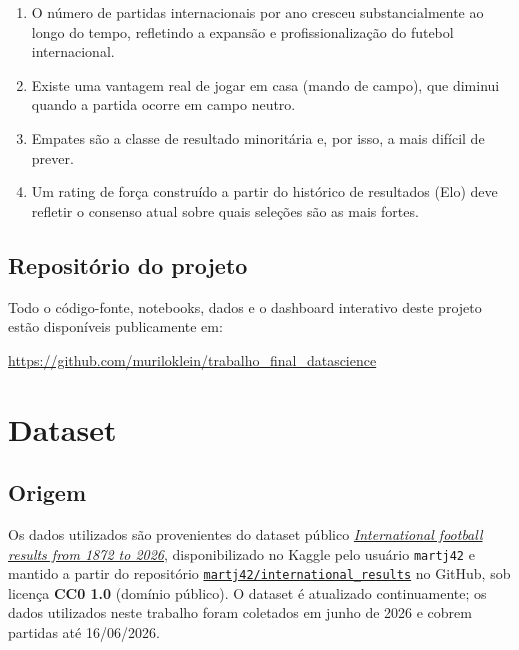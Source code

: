 \documentclass[12pt,a4paper]{article}
\begin{document}
\begin{enumerate}[label=\textbf{H\arabic*.}]
    \item O número de partidas internacionais por ano cresceu substancialmente
    ao longo do tempo, refletindo a expansão e profissionalização do futebol
    internacional.
    \item Existe uma vantagem real de jogar em casa (mando de campo), que
    diminui quando a partida ocorre em campo neutro.
    \item Empates são a classe de resultado minoritária e, por isso, a mais
    difícil de prever.
    \item Um rating de força construído a partir do histórico de resultados
    (Elo) deve refletir o consenso atual sobre quais seleções são as mais
    fortes.
\end{enumerate}

\subsection{Repositório do projeto}

Todo o código-fonte, notebooks, dados e o dashboard interativo deste projeto estão disponíveis publicamente em:

\begin{center}
\url{https://github.com/muriloklein/trabalho_final_datascience}
\end{center}

\section{Dataset}

\subsection{Origem}

Os dados utilizados são provenientes do dataset público \href{https://www.kaggle.com/datasets/martj42/international-football-results-from-1872-to-2017}{\emph{International football results from 1872 to 2026}}, disponibilizado no Kaggle pelo usuário \texttt{martj42} e mantido a partir do repositório \href{https://github.com/martj42/international_results}{\texttt{martj42/international\_results}} no GitHub, sob licença \textbf{CC0 1.0} (domínio público). O dataset é atualizado continuamente; os dados utilizados neste trabalho foram coletados em junho de 2026 e cobrem partidas até 16/06/2026.
\end{document}
